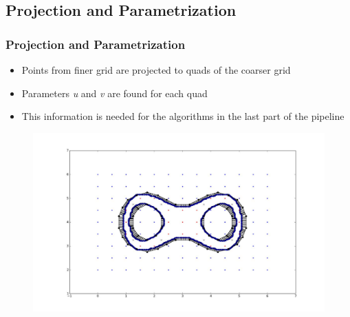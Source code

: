 \begin{frame}
\end{frame}



\subsection{Projection and Parametrization}

\begin{frame}

	\frametitle{Projection and Parametrization}
	
	\begin{itemize}
	\item Points from finer grid are projected to quads of the coarser grid 
	\item Parameters \textit{u} and \textit{v} are found for each quad
	\item This information is needed for the algorithms in the last part of the pipeline
	\end{itemize}
	\begin{figure}
	\includegraphics[scale=0.35]{Pictures/DC/DC_2.pdf}
	\end{figure}
	
\end{frame}





